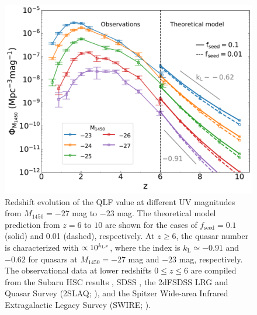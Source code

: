 \documentclass[twocolumn, twocolappendix]{aastex63}
\newcommand{\fseed}{f_\mathrm{seed}}
\newcommand{\Muv}{M_{1450}}
\begin{document}
\begin{CJK*}{UTF8}{gbsn}
\begin{figure}
\centering
\includegraphics[width=130mm]{QLFmag_z.pdf}
\caption{
Redshift evolution of the QLF value at different UV magnitudes from $\Muv= -27$ mag to $-23$ mag.
The theoretical model prediction from $z=6$ to $10$ are shown for the cases of $\fseed=0.1$ (solid) and 0.01 (dashed), respectively.
At $z\geq 6$, the quasar number is characterized with $\propto 10^{k_{\rm L}z}$,
where the index is $k_\mathrm{L} \simeq -0.91$ 
and $-0.62$ for quasars at $\Muv=-27$ mag and $-23$ mag, respectively.
The observational data at lower redshifts $0\leq z \leq 6$ are compiled from the Subaru HSC results \citep{2018PASJ...70S..34A,2018ApJ...869..150M,2020ApJ...904...89N},
SDSS \citep{2006AJ....131.2766R,2013ApJ...768..105M},
the 2dFSDSS LRG and Quasar Survey (2SLAQ; \citealt{2009MNRAS.399.1755C}),
and the Spitzer Wide-area Infrared Extragalactic Legacy Survey (SWIRE; \citealt{2008ApJ...675...49S}).
}
\label{fig:QLFmag_z}
\vspace{5mm}
\end{figure}



\end{CJK*}
\end{document}
